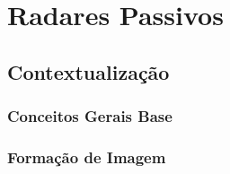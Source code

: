 
\chapter{Radares Passivos} %

\label{chap:Chapter2} %


\section{Contextualização}



\subsection{Conceitos Gerais Base}


\subsection{Formação de Imagem}

